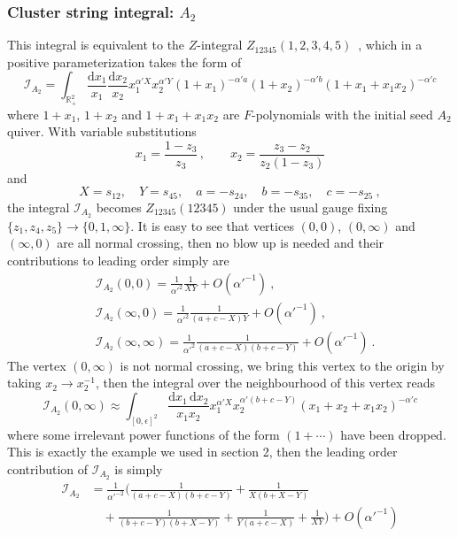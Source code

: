 \documentclass[12pt]{article}
\theoremstyle{definition}
\theoremstyle{plain}
\newcommand{\dif}{\mathrm{d}} %
\begin{document}
\subsubsection*{Cluster string integral: $A_{2}$}
This integral is equivalent to the $Z$-integral $Z_{12345}(1,2,3,4,5)$~\cite{}, which in a positive parameterization takes the form of 
\[
	\mathcal{I}_{A_{2}}=\int_{\mathbb R_+^2} \frac{\dif x_1}{x_1}\frac{\dif x_2}{x_2}x_1^{\alpha' X}x_2^{\alpha' Y}
	(1+x_1)^{-\alpha' a}(1+x_2)^{-\alpha' b}(1+x_1+x_1x_2)^{-\alpha' c}
\] 
where $1+x_{1}$, $1+x_{2}$ and $1+x_{1}+x_{1}x_{2}$ are $F$-polynomials with the initial seed $A_{2}$ quiver. With variable substitutions
\[
	x_{1}=\frac{1-z_{3}}{z_{3}}\,,\qquad x_{2}=\frac{z_{3}-z_{2}}{z_{2}(1-z_{3})}
\]
and 
\[
	X=s_{12},\quad Y=s_{45},\quad a=-s_{24},\quad b=-s_{35},\quad c=-s_{25} \:,
	\] 
the integral $\mathcal{I}_{A_{2}}$ becomes $Z_{12345}(12345)$ under the usual gauge fixing $\{z_{1},z_{4},z_{5}\}\to\{0,1,\infty\}$. It is easy to see that vertices $(0,0)$, $(0,\infty)$ and $(\infty,0)$ are all normal crossing, then no blow up is needed and their contributions to leading order simply are
\begin{align*}
	&\mathcal{I}_{A_{2}}(0,0)=\frac{1}{\alpha'^{2}}\frac{1}{XY}+O(\alpha'^{-1}) \:, \\
	&\mathcal{I}_{A_{2}}(\infty,0)=\frac{1}{\alpha'^{2}}\frac{1}{(a+c-X)Y}+O(\alpha'^{-1}) \:, \\
	&\mathcal{I}_{A_{2}}(\infty,\infty)=\frac{1}{\alpha'^{2}}\frac{1}{(a+c-X)(b+c-Y)}+O(\alpha'^{-1}) \:.
\end{align*}
The vertex $(0,\infty)$ is not normal crossing, we bring this vertex to the origin by taking $x_{2}\to x_{2}^{-1}$, then the integral over the neighbourhood of this vertex reads
\[
    \mathcal{I}_{A_{2}}(0,\infty) \approx \int_{[0,\epsilon]^{2}} \frac{\dif x_{1}\,\dif x_{2}}{x_{1} x_{2}} x_{1}^{\alpha'X}x_{2}^{\alpha'(b+c-Y)}(x_{1}+x_{2}+x_{1}x_{2})^{-\alpha'c}
\]
where some irrelevant power functions of the form $(1+\cdots)$ have been dropped. This is exactly the example we used in section 2, then the leading order contribution of $\mathcal{I}_{A_{2}}$ is simply
\begin{align*}
   \mathcal{I}_{A_2}&=\frac{1}{\alpha'^{-2}}\biggl(\frac{1}{(a+c-X) (b+c-Y)}+\frac{1}{X (b+X-Y)} \\
   &\quad +\frac{1}{(b+c-Y) (b+X-Y)}+\frac{1}{Y (a+c-X)}+\frac{1}{X Y}\biggr) + O(\alpha'^{-1}) 
\end{align*}
\end{document}
